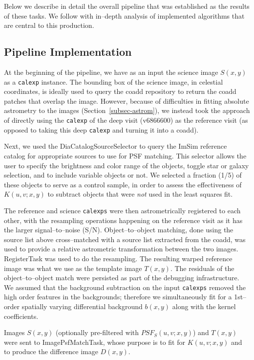 \documentclass[prd, nofootinbib, floatfix, 11pt,tightenlines,times]{article}
\begin{document}
Below we describe in detail the overall pipeline that was established
as the results of these tasks.  We follow with in--depth analysis of
implemented algorithms that are central to this production.

\subsection{Pipeline Implementation}

At the beginning of the pipeline, we have as an input the science
image $S(x,y)$ as a {\tt calexp} instance.  The bounding box of the
science image, in celestial coordinates, is ideally used to query the
coadd repository to return the coadd patches that overlap the image.
However, because of difficulties in fitting absolute astrometry to the
images (Section~\ref{subsec-astrom}), we instead took the approach of
directly using the {\tt calexp} of the deep visit (v6866600) as the
reference visit (as opposed to taking this deep {\tt calexp} and
turning it into a coadd).

Next, we used the DiaCatalogSourceSelector to query the ImSim
reference catalog for appropriate sources to use for PSF matching.
This selector allows the user to specify the brightness and color
range of the objects, toggle star or galaxy selection, and to include
variable objects or not.  We selected a fraction (1/5) of these
objects to serve as a control sample, in order to assess the
effectiveness of $K(u,v;x,y)$ to subtract objects that were {\it not}
used in the least squares fit.

The reference and science {\tt calexps} were then astrometrically
registered to each other, with the resampling operations happening on
the reference visit as it has the larger signal--to--noise (S/N).
Object--to--object matching, done using the source list above
cross--matched with a source list extracted from the coadd, was used
to provide a relative astrometric transformation between the two
images.  RegisterTask was used to do the resampling.  The resulting
warped reference image was what we use as the template image $T(x,y)$.
The residuals of the object--to--object match were persisted as part
of the debugging infrastructure.  We assumed that the background
subtraction on the input {\tt calexps} removed the high order features
in the backgrounds; therefore we simultaneously fit for a 1st--order
spatially varying differential background $b(x,y)$ along with the
kernel coefficients.

Images $S(x,y)$ (optionally pre-filtered with $PSF_S(u,v;x,y)$) and
$T(x,y)$ were sent to ImagePsfMatchTask, whose purpose is to fit for
$K(u,v;x,y)$ and to produce the difference image $D(x,y)$. 
\end{document}
